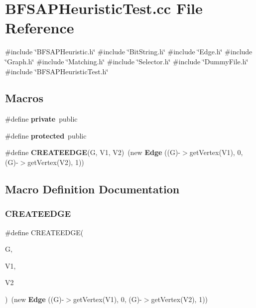 \section{B\+F\+S\+A\+P\+Heuristic\+Test.\+cc File Reference}
\label{BFSAPHeuristicTest_8cc}
{\ttfamily \#include \char`\"{}B\+F\+S\+A\+P\+Heuristic.\+h\char`\"{}}\newline
{\ttfamily \#include \char`\"{}Bit\+String.\+h\char`\"{}}\newline
{\ttfamily \#include \char`\"{}Edge.\+h\char`\"{}}\newline
{\ttfamily \#include \char`\"{}Graph.\+h\char`\"{}}\newline
{\ttfamily \#include \char`\"{}Matching.\+h\char`\"{}}\newline
{\ttfamily \#include \char`\"{}Selector.\+h\char`\"{}}\newline
{\ttfamily \#include \char`\"{}Dummy\+File.\+h\char`\"{}}\newline
{\ttfamily \#include \char`\"{}B\+F\+S\+A\+P\+Heuristic\+Test.\+h\char`\"{}}\newline
\subsection*{Macros}
\begin{DoxyCompactItemize}
\item 
\#define \textbf{ private}~public
\item 
\#define \textbf{ protected}~public
\item 
\#define \textbf{ C\+R\+E\+A\+T\+E\+E\+D\+GE}(G,  V1,  V2)~(new \textbf{ Edge} ((G)-\/$>$get\+Vertex(V1), 0, (G)-\/$>$get\+Vertex(V2), 1))
\end{DoxyCompactItemize}


\subsection{Macro Definition Documentation}
\mbox{\label{BFSAPHeuristicTest_8cc_a52ddf6d2de5e99f66a5609f59b8f13fd}} 
\subsubsection{C\+R\+E\+A\+T\+E\+E\+D\+GE}
{\footnotesize\ttfamily \#define C\+R\+E\+A\+T\+E\+E\+D\+GE(\begin{DoxyParamCaption}\item[{}]{G,  }\item[{}]{V1,  }\item[{}]{V2 }\end{DoxyParamCaption})~(new \textbf{ Edge} ((G)-\/$>$get\+Vertex(V1), 0, (G)-\/$>$get\+Vertex(V2), 1))}

